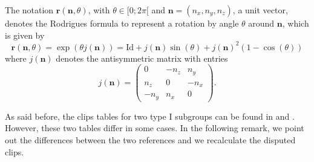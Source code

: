 \documentclass[11pt,a4paper]{amsart}
\theoremstyle{definition}
\newcommand{\1}{\mathds{1}}		            %
\newcommand{\id}{\mathrm{Id}}                %
\newcommand{\nn}{\pmb{n}}                   %
\newcommand{\vR}{\mathbf{r}}
\begin{document}
The notation $\vR(\nn,\theta)$, with $\theta\in [0;2\pi[$ and $\nn=(n_x,n_y,n_z)$, a unit vector, denotes the Rodrigues formula to represent a rotation by angle $\theta$ around $\nn$, which is given by
\begin{equation*}
	\vR(\nn,\theta)=\exp(\theta j(\nn))=\id+j(\nn)\sin(\theta)+j(\nn)^2(1-\cos(\theta))
\end{equation*}
where $j(\nn)$ denotes the antisymmetric matrix with entries
\begin{equation*}
	j(\nn)=\begin{pmatrix}
		0    & - n_z & n_y  \\
		n_z  & 0     & -n_x \\
		-n_y & n_x   & 0
	\end{pmatrix}.
\end{equation*}

As said before, the clips tables for two type I subgroups can be found in \cite[table 1]{Chossat1994} and \cite[Table 1]{Olive2019}. However, these two tables differ in some cases. In the following remark, we point out the differences between the two references and we recalculate the disputed clips.
\end{document}
